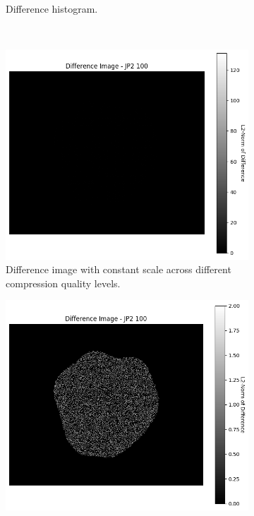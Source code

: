 \begin{figure}[htb]
\begin{subfigure}[b]{0.48\textwidth}
        \caption{Difference histogram.}
        \label{fig:img_quality_comp_jp2_100_histo}
    \end{subfigure}
    \\
    \begin{subfigure}[b]{0.48\textwidth}
        \centering
        \includegraphics[width=\textwidth]{doc/thesis/0_figures/compare_quality/set1/jp2_100_diff_heatmap.png}
        \caption{Difference image with constant scale across different compression quality levels.}
        \label{fig:img_quality_comp_jp2_100_diff}
    \end{subfigure}
    \begin{subfigure}[b]{0.48\textwidth}
        \centering
        \includegraphics[width=\textwidth]{doc/thesis/0_figures/compare_quality/set1/jp2_100_diff_heatmap_rel.png}

\end{subfigure}
\end{figure}
